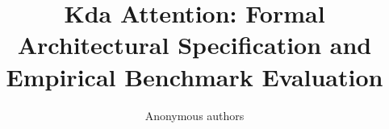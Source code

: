 \title{\textbf{Kda Attention: Formal Architectural Specification and Empirical Benchmark Evaluation}}

\author{Anonymous authors}
